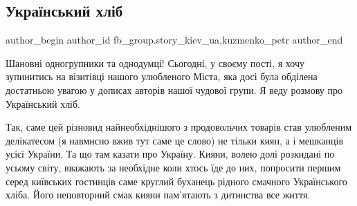  
 
 
 
 
 
\subsection{Український хліб}
\label{sec:31_03_2021.fb.fb_group.story_kiev_ua.1.ukr_hleb}
 
\ifcmt
 author_begin
   author_id fb_group.story_kiev_ua,kuzmenko_petr
 author_end
\fi

Шановні одногрупники та однодумці! Сьогодні, у своєму пості, я хочу зупинитись
на візитівці нашого улюбленого Міста, яка досі була обділена достатньою увагою
у дописах авторів нашої чудової групи. Я веду розмову про Український хліб.

Так, саме цей різновид найнеобхіднішого з продовольчих товарів став улюбленим
делікатесом (я навмисно вжив тут саме це слово) не тільки киян, а і мешканців
усієї України. Та що там казати про Україну. Кияни, волею долі розкидані по
усьому світу, вважають за необхідне коли хтось їде до них, попросити першим
серед київських гостинців саме круглий буханець рідного смачного Українського
хліба. Його неповторний смак кияни пам'ятають з дитинства все життя. 

\begin{multicols}{2} %
\setlength{\parindent}{0pt}






\end{multicols} %

